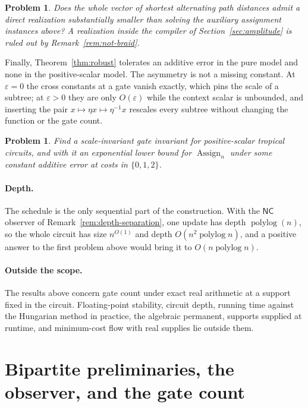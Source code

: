 \documentclass[11pt]{article}
\newtheorem{problem}[theorem]{Problem}
\newcommand{\Assign}{\operatorname{Assign}}
\begin{document}
\begin{problem}
Does the whole vector of shortest alternating path distances admit a direct
realization substantially smaller than solving the auxiliary assignment
instances above?  A realization inside the compiler of
Section~\ref{sec:amplitude} is ruled out by Remark~\ref{rem:not-braid}.
\end{problem}

Finally, Theorem~\ref{thm:robust} tolerates an additive error in the pure model
and none in the positive-scalar model.  The asymmetry is not a missing constant.
At $\varepsilon=0$ the cross constants at a gate vanish exactly, which pins the
scale of a subtree; at $\varepsilon>0$ they are only $O(\varepsilon)$ while the
context scalar is unbounded, and inserting the pair $x\mapsto\eta x\mapsto
\eta^{-1}x$ rescales every subtree without changing the function or the gate
count.

\begin{problem}
Find a scale-invariant gate invariant for positive-scalar tropical circuits, and
with it an exponential lower bound for $\Assign_n$ under some constant additive
error at costs in $\{0,1,2\}$.
\end{problem}

\paragraph{Depth.}
The schedule is the only sequential part of the construction.  With the
$\mathsf{NC}$ observer of Remark~\ref{rem:depth-separation}, one update has depth
$\operatorname{polylog}(n)$, so the whole circuit has size $n^{O(1)}$ and depth
$O(n^{2}\operatorname{polylog}n)$, and a positive answer to the first problem
above would bring it to $O(n\operatorname{polylog}n)$.

\paragraph{Outside the scope.}
The results above concern gate count under exact real arithmetic at a support
fixed in the circuit.  Floating-point stability, circuit depth, running time
against the Hungarian method in practice, the algebraic permanent, supports
supplied at runtime, and minimum-cost flow with real supplies lie outside them.





\appendix

\section{Bipartite preliminaries, the observer, and the gate count}
\label{app:graph}
\end{document}
